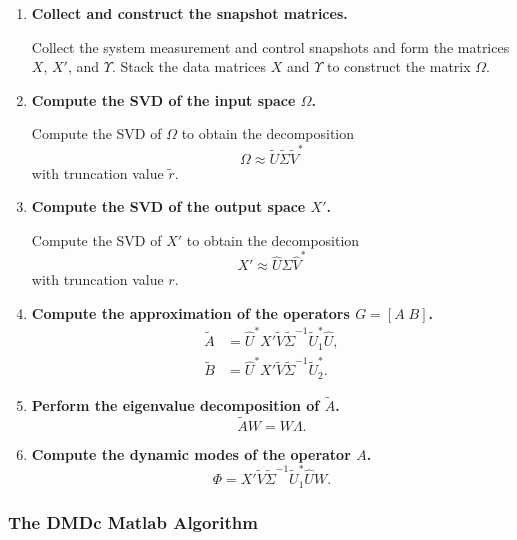 \documentclass{article}
\begin{document}
\begin{enumerate}
    \item \textbf{Collect and construct the snapshot matrices.}  
    
    Collect the system measurement and control snapshots and form the matrices 
    $X$, $X'$, and $\Upsilon$. Stack the data matrices $X$ and $\Upsilon$ to 
    construct the matrix $\Omega$.

    \item \textbf{Compute the SVD of the input space $\Omega$.}  
    
    Compute the SVD of $\Omega$ to obtain the decomposition
    \[
        \Omega \approx \tilde{U} \tilde{\Sigma} \tilde{V}^*
    \]
    with truncation value $\tilde{r}$.

    \item \textbf{Compute the SVD of the output space $X'$.}  
    
    Compute the SVD of $X'$ to obtain the decomposition
    \[
        X' \approx \hat{U} \hat{\Sigma} \hat{V}^*
    \]
    with truncation value $r$.

    \item \textbf{Compute the approximation of the operators $G = [A \; B]$.}  
    \begin{align}
        \tilde{A} &= \hat{U}^* X' \tilde{V} \tilde{\Sigma}^{-1} \tilde{U}_1^* \hat{U}, \\
        \tilde{B} &= \hat{U}^* X' \tilde{V} \tilde{\Sigma}^{-1} \tilde{U}_2^*.
    \end{align}

    \item \textbf{Perform the eigenvalue decomposition of $\tilde{A}$.}  
    \[
        \tilde{A} W = W \Lambda.
    \]

    \item \textbf{Compute the dynamic modes of the operator $A$.}  
    \[
        \Phi = X' \tilde{V} \tilde{\Sigma}^{-1} \tilde{U}_1^* \hat{U} W.
    \]
\end{enumerate}

\vspace{1cm}

\subsubsection*{The DMDc Matlab Algorithm}

\vspace{1cm}
\end{document}
